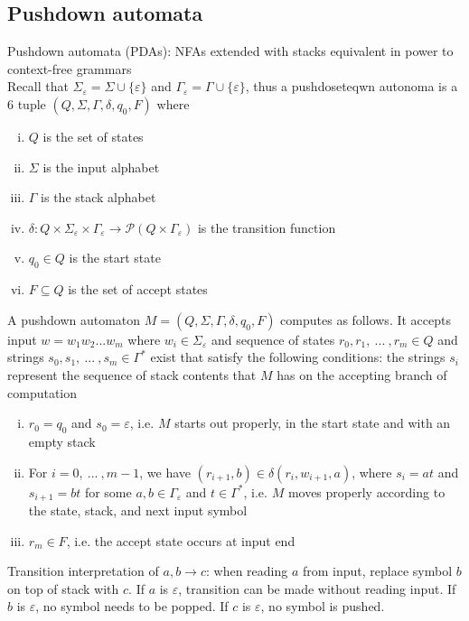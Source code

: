\documentclass{article}
\newcommand*{\<}{\langle}
\renewcommand*{\>}{\rangle}
\begin{document}
		\subsection{Pushdown automata}
			Pushdown automata (PDAs): NFAs extended with stacks equivalent in power to context-free grammars \\
			Recall that $\Sigma_\varepsilon = \Sigma \cup \{\varepsilon\}$ and $\Gamma_\varepsilon = \Gamma \cup \{\varepsilon\}$, thus a pushdoseteqwn autonoma is a 6 tuple $(Q, \Sigma, \Gamma, \delta, q_0, F)$ where 
			\begin{enumerate}[(i)]
				\item $Q$ is the set of states
				\item $\Sigma$ is the input alphabet
				\item $\Gamma$ is the stack alphabet
				\item $\delta: Q \times \Sigma_\varepsilon \times \Gamma_\varepsilon \to \mathcal{P}(Q \times \Gamma_\varepsilon)$ is the transition function
				\item $q_0 \in Q$ is the start state
				\item $F \subseteq Q$ is the set of accept states
				\end{enumerate}
			A pushdown automaton $M = (Q, \Sigma, \Gamma, \delta, q_0, F)$ computes as follows. It accepts input $w = w_1w_2...w_m$ where $w_i \in \Sigma_\varepsilon$ and sequence of states $r_0, r_1,\:...\:, r_m \in Q$ and strings $s_0, s_1,\:...\:, s_m \in \Gamma^*$ exist that satisfy the following conditions: the strings $s_i$ represent the sequence of stack contents that $M$ has on the accepting branch of computation
			\begin{enumerate}[(i)]
				\item $r_0 = q_0$ and $s_0 = \varepsilon$, i.e. $M$ starts out properly, in the start state and with an empty stack
				\item For $i = 0,\:...\:, m - 1$, we have $(r_{i + 1}, b) \in \delta(r_i, w_{i + 1}, a)$, where $s_i = at$ and $s_{i + 1} = bt$ for some $a, b \in \Gamma_\varepsilon$ and $t \in \Gamma^*$, i.e. $M$ moves properly according to the state, stack, and next input symbol
				\item $r_m \in F$, i.e. the accept state occurs at input end
				\end{enumerate}
			Transition interpretation of $a, b \to c$: when reading $a$ from input, replace symbol $b$ on top of stack with $c$. If $a$ is $\varepsilon$, transition can be made without reading input. If $b$ is $\varepsilon$, no symbol needs to be popped. If $c$ is $\varepsilon$, no symbol is pushed. \\
\end{document}
